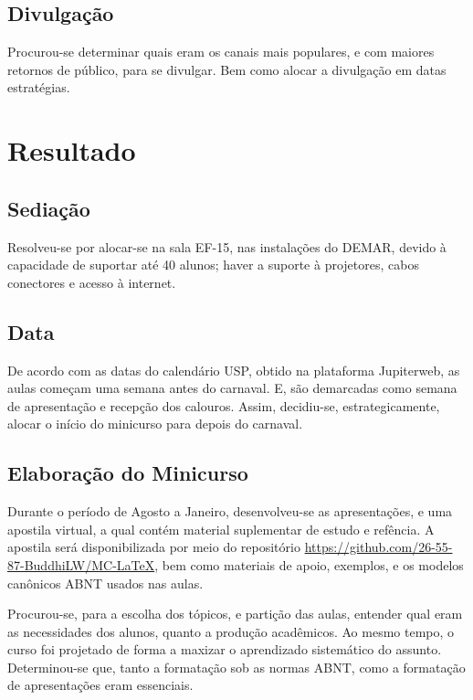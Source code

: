 \documentclass[
	12pt,				%
	openright,			%
	oneside,			%
	a4paper,			%
	english,			%
	french,				%
	spanish,			%
	brazil,				%
	]{abntex2}
\begin{document}
\section{Divulgação}

Procurou-se determinar quais eram os canais mais populares, e com
maiores retornos de público, para se divulgar. Bem como alocar a divulgação em datas estratégias.





\chapter{Resultado}

\section{Sediação}
Resolveu-se por alocar-se na sala EF-15, nas instalações do DEMAR,
devido à capacidade de suportar até 40 alunos; haver a suporte à
projetores, cabos conectores e acesso à internet.

\section{Data}
De acordo com as datas do calendário USP, obtido na plataforma
Jupiterweb, as aulas começam uma semana antes do carnaval. E, são
demarcadas como semana de apresentação e recepção dos calouros. Assim,
decidiu-se, estrategicamente, alocar o início do minicurso para depois
do carnaval.

\section{Elaboração do Minicurso}
Durante o período de Agosto a Janeiro, desenvolveu-se as apresentações, e
uma apostila virtual, a qual contém material suplementar de estudo e
refência. A apostila será
disponibilizada por meio do repositório
\url{https://github.com/26-55-87-BuddhiLW/MC-LaTeX}, bem como
materiais de apoio, exemplos, e os modelos canônicos ABNT usados nas aulas.

Procurou-se, para a escolha dos tópicos, e partição das aulas,
entender qual eram as necessidades dos alunos, quanto a produção
acadêmicos. Ao mesmo tempo, o curso foi projetado de forma a maxizar o
aprendizado sistemático do assunto.  Determinou-se que, tanto a
formatação sob as normas ABNT, como a formatação de apresentações eram
essenciais.
\end{document}
